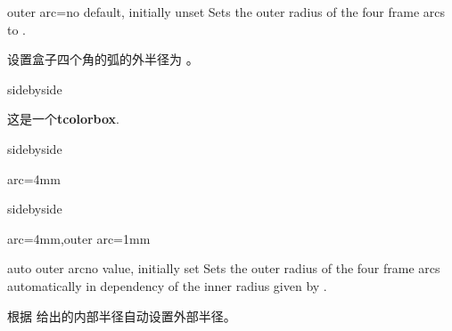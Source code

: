 \begin{docTcbKey}{outer arc}{=}{no default, initially unset}
Sets the outer radius of the four frame arcs to .

设置盒子四个角的弧的外半径为 。

\begin{dispExample*}{sidebyside}
\begin{tcolorbox}[]
这是一个\textbf{tcolorbox}.
\end{tcolorbox}
\end{dispExample*}

\begin{dispExample*}{sidebyside}
\begin{tcolorbox}[arc=4mm]
arc=4mm
\end{tcolorbox}
\end{dispExample*}

\begin{dispExample*}{sidebyside}
\begin{tcolorbox}[arc=4mm,%
outer arc=1mm]
arc=4mm,outer arc=1mm
\end{tcolorbox}
\end{dispExample*}
\end{docTcbKey}

\begin{docTcbKey}{auto outer arc}{}{no value, initially set}
Sets the outer radius of the four frame arcs automatically in
dependency of the inner radius given by .

根据  给出的内部半径自动设置外部半径。

\end{docTcbKey}
  